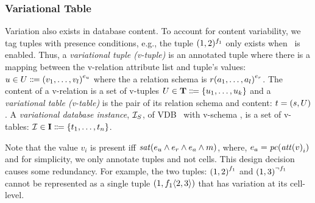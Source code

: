 \subsubsection{Variational Table}
\label{sec:vtab}

Variation also exists in database content. To account 
for content variability, we tag tuples with 
presence conditions, e.g., the tuple $(1,2)^{\A}$ only exists
when \A\  is enabled. 
%
Thus, a \emph{variational tuple (v-tuple)} is an annotated tuple where 
there is a mapping between the v-relation attribute list and  tuple's values:
\ensuremath{
\vTuple \in \vRelCont \eqq \annot  [\dimMeta_\vTuple] {(\vi v \numAtts)}
} where the a relation schema is 
\ensuremath{
\vRel  \annot [\dimMeta_\vRel] {(\vi \vAtt \numAtts)}
}.
%
The content of a v-relation
is a set of v-tuples 
$ \vRelCont \in \vRelContSet \eqq \setDef {\vi \vTuple \numTuples}$
and 
%
a  \emph{variational table (v-table)} is the pair of its relation schema and content: 
\ensuremath{
\vTab = (\vRelSch, \vRelCont)
}.
%
A \emph{variational database instance}, \ensuremath{\vdbInst_\vSch}, 
of VDB \vDB\ with v-schema \vSch, 
is a set of v-tables: 
$\synDef \vdbInst  \vdbInstSet \eqq \setDef {\vi \vTab \numRels} $.
%

Note that the value $v_i$ is present iff 
$\sat {\dimMeta_\vTuple \wedge \dimMeta_\vRel \wedge \dimMeta_\vAtt \wedge \fModel}$,
where, 
$\dimMeta_\vAtt = \getPC {\getAtt v_i}$ and
%
for simplicity, 
we only annotate tuples and not cells. 
This design decision causes some redundancy.
For example, the two tuples: 
\ensuremath{\annot [\fOne] {(1,2)}} and \ensuremath{\annot [\neg\fOne] {(1,3)}}
cannot be represented as a single tuple \ensuremath{(1, \chc [\fOne] {2,3})} 
that has variation at its cell-level.
%

